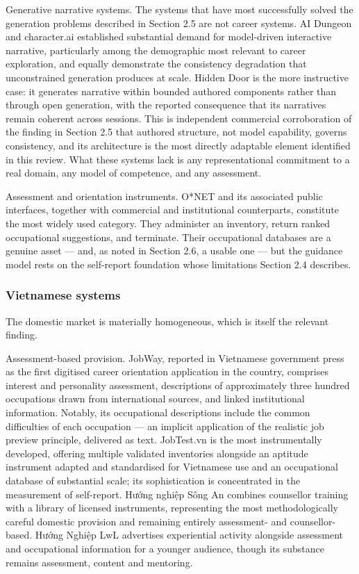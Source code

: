Generative narrative systems. The systems that have most successfully solved the generation problems described in Section 2.5 are not career systems. AI Dungeon\cite{r87} and character.\allowbreak{}ai\cite{r88} established substantial demand for model-\allowbreak{}driven interactive narrative, particularly among the demographic most relevant to career exploration, and equally demonstrate the consistency degradation that unconstrained generation produces at scale. Hidden Door\cite{r89} is the more instructive case: it generates narrative within bounded authored components rather than through open generation, with the reported consequence that its narratives remain coherent across sessions. This is independent commercial corroboration of the finding in Section 2.5 that authored structure, not model capability, governs consistency, and its architecture is the most directly adaptable element identified in this review. What these systems lack is any representational commitment to a real domain, any model of competence, and any assessment.

Assessment and orientation instruments. O*NET and its associated public interfaces, together with commercial and institutional counterparts, constitute the most widely used category. They administer an inventory, return ranked occupational suggestions, and terminate. Their occupational databases are a genuine asset --- and, as noted in Section 2.6, a usable one --- but the guidance model rests on the self-report foundation whose limitations Section 2.4 describes.

\subsubsection{Vietnamese systems}

The domestic market is materially homogeneous, which is itself the relevant finding.

Assessment-\allowbreak{}based provision. JobWay\cite{r90}, reported in Vietnamese government press as the first digitised career orientation application in the country, comprises interest and personality assessment, descriptions of approximately three hundred occupations drawn from international sources, and linked institutional information. Notably, its occupational descriptions include the common difficulties of each occupation --- an implicit application of the realistic job preview principle, delivered as text. JobTest.vn\cite{r91} is the most instrumentally developed, offering multiple validated inventories alongside an aptitude instrument adapted and standardised for Vietnamese use and an occupational database of substantial scale; its sophistication is concentrated in the measurement of self-\allowbreak{}report. Hướng nghiệp Sông An\cite{r92} combines counsellor training with a library of licensed instruments, representing the most methodologically careful domestic provision and remaining entirely assessment- and counsellor-\allowbreak{}based. Hướng Nghiệp LwL\cite{r93} advertises experiential activity alongside assessment and occupational information for a younger audience, though its substance remains assessment, content and mentoring.

